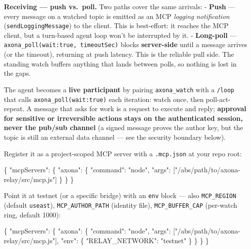 \documentclass[
  nobib]{tufte-handout}
\newenvironment{Shaded}{}{}
\newcommand{\DataTypeTok}[1]{\textcolor[rgb]{0.56,0.13,0.00}{#1}}
\newcommand{\FunctionTok}[1]{\textcolor[rgb]{0.02,0.16,0.49}{#1}}
\newcommand{\OtherTok}[1]{\textcolor[rgb]{0.00,0.44,0.13}{#1}}
\newcommand{\StringTok}[1]{\textcolor[rgb]{0.25,0.44,0.63}{#1}}
\begin{document}
\textbf{Receiving --- push vs.~poll.} Two paths cover the same arrivals:
- \textbf{Push} --- every message on a watched topic is emitted as an
MCP \emph{logging notification} (\texttt{sendLoggingMessage}) to the
client. This is best-effort: it reaches the MCP client, but a turn-based
agent loop won't be interrupted by it. - \textbf{Long-poll} ---
\texttt{axona\_poll(wait:true,\ timeoutSec)} blocks \textbf{server-side}
until a message arrives (or the timeout), returning at push latency.
This is the reliable pull side. The standing watch buffers anything that
lands between polls, so nothing is lost in the gaps.

The agent becomes a \textbf{live participant} by pairing
\texttt{axona\_watch} with a \texttt{/loop} that calls
\texttt{axona\_poll(wait:true)} each iteration: watch once, then
poll-act-repeat. A message that asks for work is a request to execute
and reply; \textbf{approval for sensitive or irreversible actions stays
on the authenticated session, never the pub/sub channel} (a signed
message proves the author key, but the topic is still an external data
channel --- see the security boundary below).

Register it as a project-scoped MCP server with a \texttt{.mcp.json} at
your repo root:

\begin{Shaded}
\begin{Highlighting}[]
\FunctionTok{\{}
  \DataTypeTok{"mcpServers"}\FunctionTok{:} \FunctionTok{\{}
    \DataTypeTok{"axona"}\FunctionTok{:} \FunctionTok{\{} \DataTypeTok{"command"}\FunctionTok{:} \StringTok{"node"}\FunctionTok{,} \DataTypeTok{"args"}\FunctionTok{:} \OtherTok{[}\StringTok{"/abs/path/to/axona{-}relay/src/mcp.js"}\OtherTok{]} \FunctionTok{\}}
  \FunctionTok{\}}
\FunctionTok{\}}
\end{Highlighting}
\end{Shaded}

Point it at testnet (or a specific bridge) with an \texttt{env} block
--- also \texttt{MCP\_REGION} (default \texttt{useast}),
\texttt{MCP\_AUTHOR\_PATH} (identity file), \texttt{MCP\_BUFFER\_CAP}
(per-watch ring, default 1000):

\begin{Shaded}
\begin{Highlighting}[]
\FunctionTok{\{}
  \DataTypeTok{"mcpServers"}\FunctionTok{:} \FunctionTok{\{}
    \DataTypeTok{"axona"}\FunctionTok{:} \FunctionTok{\{}
      \DataTypeTok{"command"}\FunctionTok{:} \StringTok{"node"}\FunctionTok{,}
      \DataTypeTok{"args"}\FunctionTok{:} \OtherTok{[}\StringTok{"/abs/path/to/axona{-}relay/src/mcp.js"}\OtherTok{]}\FunctionTok{,}
      \DataTypeTok{"env"}\FunctionTok{:} \FunctionTok{\{} \DataTypeTok{"RELAY\_NETWORK"}\FunctionTok{:} \StringTok{"testnet"} \FunctionTok{\}}
    \FunctionTok{\}}
  \FunctionTok{\}}
\FunctionTok{\}}
\end{Highlighting}
\end{Shaded}
\end{document}
